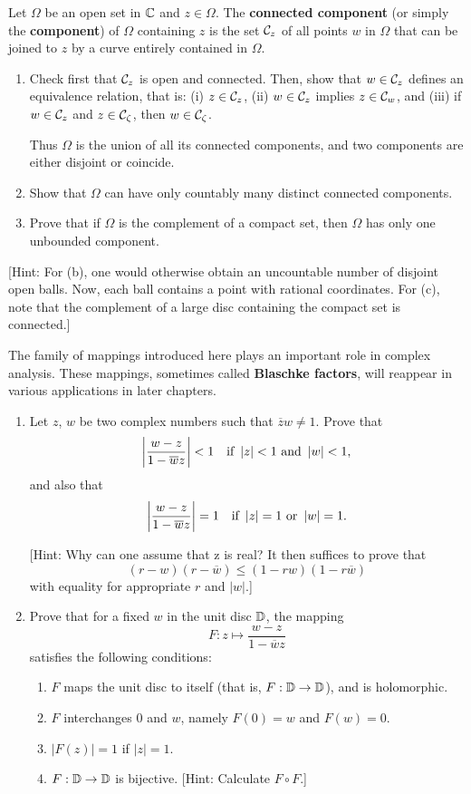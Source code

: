 \begin{exercise}
Let $\Omega$ be an open set in $\mathbb{C}$ and $z \in \Omega$. The \textbf{connected component} (or simply the \textbf{component}) of $\Omega$ containing $z$ is the set $\mathcal{C}_z$ of all points $w$ in $\Omega$ that can be joined to $z$ by a curve entirely contained in $\Omega$.
\begin{enumerate}
\item Check first that $\mathcal{C}_z$ is open and connected. Then, show that $w \in \mathcal{C}_z$ defines an equivalence relation, that is: (i) $z \in \mathcal{C}_z$, (ii) $w \in \mathcal{C}_z$ implies $z \in \mathcal{C}_w$, and (iii) if $w \in \mathcal{C}_z$ and $z \in \mathcal{C}_\zeta$, then $w \in \mathcal{C}_\zeta$.

Thus $\Omega$ is the union of all its connected components, and two components are either disjoint or coincide.
\item Show that $\Omega$ can have only countably many distinct connected components.
\item Prove that if $\Omega$ is the complement of a compact set, then $\Omega$ has only one unbounded component.
\end{enumerate}
[Hint: For (b), one would otherwise obtain an uncountable number of disjoint open
balls. Now, each ball contains a point with rational coordinates. For (c), note that
the complement of a large disc containing the compact set is connected.]
\end{exercise}

\begin{exercise}
The family of mappings introduced here plays an important role in complex analysis. These mappings, sometimes called \textbf{Blaschke factors}, will reappear in various applications in later chapters.

\begin{enumerate}[label=(\alph*)]
\item Let $z$, $w$ be two complex numbers such that $\overline{z}w 
\neq 1$. Prove that $$\left\lvert \frac{w-z}{1-\overline{w}z} \right\rvert<1 \quad \text{if } \left\lvert z \right\rvert < 1 \text{ and } \left\lvert w \right\rvert < 1,$$ and also that $$\left\lvert \frac{w-z}{1-\overline{w}z} \right\rvert = 1 \quad \text{if } \left\lvert z \right\rvert=1 \text{ or } \left\lvert w \right\rvert=1.$$

[Hint: Why can one assume that z is real? It then suffices to prove that $$(r - w)(r - \overline{w}) \leq (1 - rw)(1 - r\overline{w})$$
with equality for appropriate $r$ and $|w|$.]
\item Prove that for a fixed $w$ in the unit disc $\mathbb{D}$, the mapping $$F: z\mapsto \frac{w-z}{1-\overline{w}z}$$ satisfies the following conditions:
\begin{enumerate}[label=(\roman*)]
\item $F$ maps the unit disc to itself (that is, $F: \mathbb{D} \to \mathbb{D}$), and is holomorphic.
\item $F$ interchanges $0$ and $w$, namely $F(0) = w$ and $F(w) = 0$.
\item $|F(z)| = 1$ if $|z| = 1$.
\item $F: \mathbb{D} \to \mathbb{D}$ is bijective. [Hint: Calculate $F \circ F$.]
\end{enumerate}
\end{enumerate}
\end{exercise}

